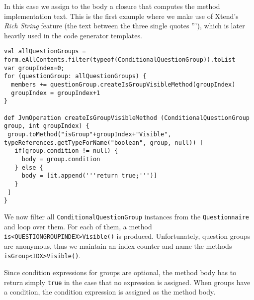 In this case we assign to the body a closure that computes the method
implementation text. This is the first example where we make use of Xtend's \emph{Rich
String} feature (the text between the three single quotes '''), which is
later heavily used in the code generator templates.

\begin{lstlisting}[language=Xtend]
val allQuestionGroups = form.eAllContents.filter(typeof(ConditionalQuestionGroup)).toList
var groupIndex=0;
for (questionGroup: allQuestionGroups) {
  members += questionGroup.createIsGroupVisibleMethod(groupIndex)
  groupIndex = groupIndex+1
}

def JvmOperation createIsGroupVisibleMethod (ConditionalQuestionGroup group, int groupIndex) {
 group.toMethod("isGroup"+groupIndex+"Visible", typeReferences.getTypeForName("boolean", group, null)) [
   if(group.condition != null) {
     body = group.condition
   } else {
     body = [it.append('''return true;''')]
   }
 ]
}
\end{lstlisting}

We now filter all \texttt{ConditionalQuestionGroup} instances from the \texttt{Questionnaire} and
loop over them. For each of them, a method \texttt{is<QUESTIONGROUPINDEX>Visible()} 
is produced. Unfortunately, question groups are anonymous, thus we
maintain an index counter and name the methods \texttt{isGroup<IDX>Visible()}.

Since condition expressions for groups are optional, the method body has to
return simply \texttt{true} in the case that no expression is assigned. When groups have
a condition, the condition expression is assigned as the method body.

